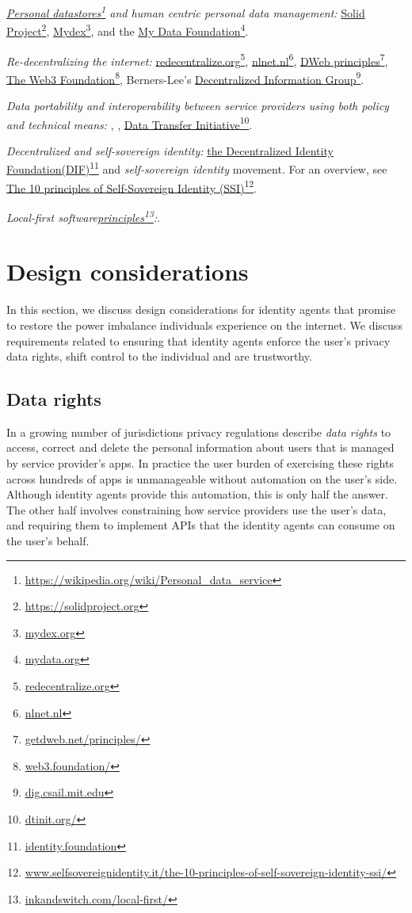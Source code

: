 \documentclass[11pt, oneside]{article}   	%
\newcommand{\hyperfootnote}[1][]{\def\ArgI{{#1}}\hyperfootnoteRelay}
\newcommand\hyperfootnoteRelay[2][]{\href{#1#2}{\ArgI}\footnote{\href{#1#2}{#2}}}
\begin{document}
\emph{\hyperfootnote[Personal datastores][https://]{https://wikipedia.org/wiki/Personal\_data\_service} and human centric  personal data management:} \hyperfootnote[Solid Project][https://]{https://solidproject.org}, \hyperfootnote[Mydex][https://]{mydex.org}, and the \hyperfootnote[My Data Foundation][https://]{mydata.org}. 

\emph{Re-decentralizing the internet:} \hyperfootnote[redecentralize.org][https://]{redecentralize.org}, \hyperfootnote[nlnet.nl][https://]{nlnet.nl}, \hyperfootnote[DWeb principles][https://]{getdweb.net/principles/}, \hyperfootnote[The Web3 Foundation][https://]{web3.foundation/}, Berners-Lee's \hyperfootnote[Decentralized Information Group][https://]{dig.csail.mit.edu}. 

\emph{Data portability and interoperability between service providers using both policy and technical means:} \cite{Doctorow2021}, \cite{Cyphers2021}, \hyperfootnote[Data Transfer Initiative][https://]{dtinit.org/}.

\emph{Decentralized and self-sovereign identity:} \hyperfootnote[the Decentralized Identity Foundation(DIF)][https://]{identity.foundation} and \emph{self-sovereign identity}\cite{Preukschat2021} movement. For an overview, see \hyperfootnote[The 10 principles of Self-Sovereign Identity (SSI)][https://]{www.selfsovereignidentity.it/the-10-principles-of-self-sovereign-identity-ssi/}. 

\emph{Local-first software\hyperfootnote[principles][https://]{inkandswitch.com/local-first/}:}\cite{Kleppmann2019}.

\section{Design considerations} %

In this section, we discuss design considerations for identity agents that promise to restore the power imbalance individuals experience on the internet. We discuss requirements related to ensuring that identity agents enforce the user's privacy data rights, shift control to the individual and are trustworthy. 

\subsection{Data rights}

In a growing number of jurisdictions privacy regulations describe \emph{data rights} to access, correct and delete the personal information about users that is managed by service provider's apps. In practice the user burden of exercising these rights across hundreds of apps is unmanageable without automation on the user's side. Although identity agents provide this automation, this is only half the answer. The other half involves constraining how service providers use the user's data, and requiring them to implement APIs that the identity agents can consume on the user's behalf. 
\end{document}
